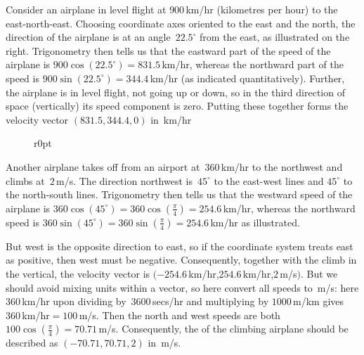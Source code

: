 \begin{example}
Consider an airplane in level flight at \(900\)\,km/hr (kilometres per hour) to the east-north-east.
Choosing coordinate axes oriented to the east and the north, the direction of the airplane is at an angle~\(22.5^\circ\) from the east, as illustrated on the right.
Trigonometry then tells us that the eastward part of the speed of the airplane is \(900\cos(22.5^\circ)=831.5\)\,km/hr, whereas the northward part of the speed is \(900\sin(22.5^\circ)=344.4\)\,km/hr (as indicated quantitatively).
Further, the airplane is in level flight, not going up or down, so in the third direction of space (vertically) its speed component is zero.
Putting these together forms the velocity vector \((831.5,344.4,0)\) in~km/hr 


\begin{figure}r{0pt}
%
\end{figure}%
Another airplane takes off from an airport at~\(360\)\,km/hr to the northwest and climbs at~\(2\)\,m/s.
The direction northwest is~\(45^\circ\) to the east-west lines and \(45^\circ\) to the north-south lines.  
Trigonometry then tells us that the westward speed of the airplane is \(360\cos(45^\circ)=360\cos(\tfrac\pi4)=254.6\)\,km/hr, whereas the northward speed is \(360\sin(45^\circ)=360\sin(\tfrac\pi4)=254.6\)\,km/hr as illustrated.

But west is the opposite direction to east, so if the coordinate system treats east as positive, then west must be negative.
Consequently, together with the climb in the vertical, the velocity vector is \((-254.6\)\,km/hr,\(254.6\)\,km/hr,\(2\,\)m/s\()\).
But we should avoid mixing units within a vector, so here convert all speeds to~m/s: here \(360\)\,km/hr upon dividing by~\(3600\)\,secs/hr and multiplying by \(1000\)\,m/km gives \(360\)\,km/hr\({}=100\)\,m/s.
Then the north and west speeds are both \(100\cos(\tfrac\pi4)=70.71\)\,m/s.
Consequently, the  of the climbing airplane should be described as \((-70.71,70.71,2)\) in~m/s.
\end{example}
\endgroup


